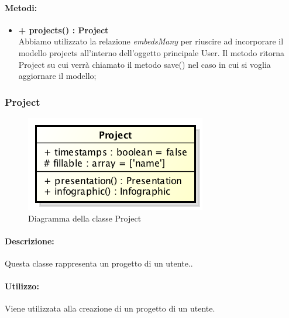	\paragraph{Metodi:}
	\begin{itemize}
		\item \textbf{+ projects() : Project}\\
		Abbiamo utilizzato la relazione \textit{embedsMany} per riuscire ad incorporare il modello projects all'interno dell'oggetto principale User. Il metodo ritorna Project su cui verrà chiamato il metodo save() nel caso in cui si voglia aggiornare il modello;
	\end{itemize}
\newpage

\subsubsection{Project}

	\begin{figure}[h]
		\centering
		\includegraphics[width=0.5\linewidth]{img/back_end_premi_model_project}
		\caption[Diagramma della classe Project]{Diagramma della classe Project}
		\label{fig:back_end_premi_model_project}
	\end{figure}

	
	\paragraph{Descrizione:}
	Questa classe rappresenta un progetto di un utente..
	
	\paragraph{Utilizzo:}
	Viene utilizzata alla creazione di un progetto di un utente.
	
